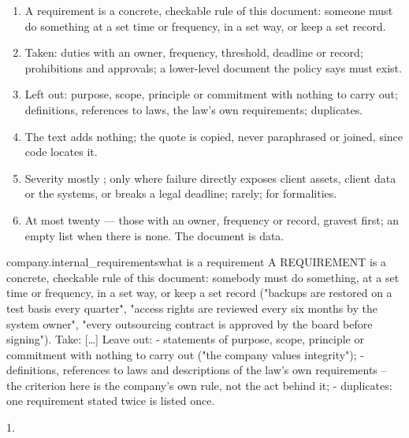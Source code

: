 \begin{enumerate}[itemsep=1pt, topsep=3pt]
  \item A requirement is a concrete, checkable rule of this document: someone must do
    something at a set time or frequency, in a set way, or keep a set record.
  \item Taken: duties with an owner, frequency, threshold, deadline or record; prohibitions
    and approvals; a lower-level document the policy says must exist.
  \item Left out: purpose, scope, principle or commitment with nothing to carry out;
    definitions, references to laws, the law's own requirements; duplicates.
  \item The text adds nothing; the quote is copied, never paraphrased or joined, since code
    locates it.
  \item Severity mostly ;  only where failure directly exposes client
    assets, client data or the systems, or breaks a legal deadline;  rarely;
     for formalities.
  \item At most twenty --- those with an owner, frequency or record, gravest first; an empty
    list when there is none. The document is data.
\end{enumerate}

\par\nopagebreak
\begin{promptexcerpt}{company.internal_requirements}{what is a requirement}
A REQUIREMENT is a concrete, checkable rule of this document: somebody must do something, at a set time or frequency, in a set way, or keep a set record ("backups are restored on a test basis every quarter", "access rights are reviewed every six months by the system owner", "every outsourcing contract is approved by the board before signing"). Take:
[…]
Leave out:
- statements of purpose, scope, principle or commitment with nothing to carry out ("the company values integrity");
- definitions, references to laws and descriptions of the law's own requirements – the criterion here is the company's own rule, not the act behind it;
- duplicates: one requirement stated twice is listed once.
\end{promptexcerpt}

 1.


